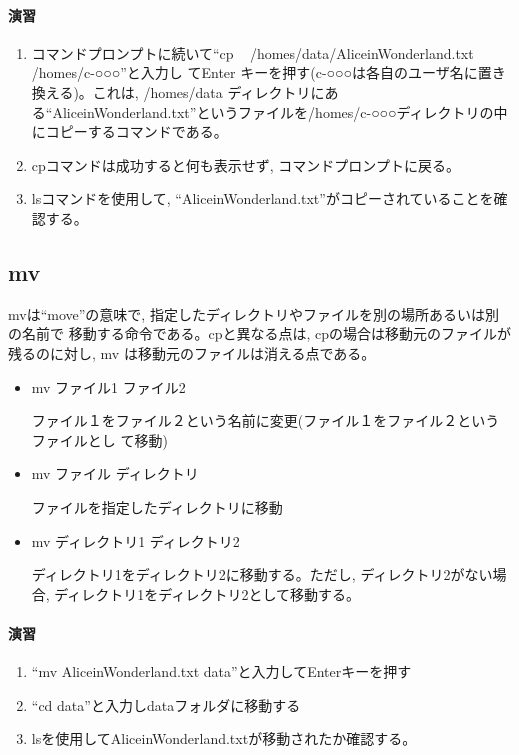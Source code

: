\paragraph{演習}
\begin{enumerate}
\item コマンドプロンプトに続いて``cp ~ /homes/data/AliceinWonderland.txt ~ /homes/c-○○○''と入力し
てEnter キーを押す(c-○○○は各自のユーザ名に置き換える)。これは, /homes/data
ディレクトリにある``AliceinWonderland.txt''というファイルを/homes/c-○○○ディレクトリの中
にコピーするコマンドである。
\item cpコマンドは成功すると何も表示せず, コマンドプロンプトに戻る。
\item lsコマンドを使用して, ``AliceinWonderland.txt''がコピーされていることを確認する。
\end{enumerate}

\subsection{mv}

mvは``move''の意味で, 指定したディレクトリやファイルを別の場所あるいは別の名前で
移動する命令である。cpと異なる点は, cpの場合は移動元のファイルが残るのに対し, mv
は移動元のファイルは消える点である。

\begin{itemize}
\item mv ファイル1 ファイル2

      ファイル１をファイル２という名前に変更(ファイル１をファイル２というファイルとし
      て移動)

\item mv ファイル ディレクトリ

      ファイルを指定したディレクトリに移動

\item mv ディレクトリ1 ディレクトリ2

      ディレクトリ1をディレクトリ2に移動する。ただし, ディレクトリ2がない場合,
      ディレクトリ1をディレクトリ2として移動する。
\end{itemize}

\paragraph{演習}
\begin{enumerate}
    \item ``mv AliceinWonderland.txt data''と入力してEnterキーを押す
    \item ``cd data''と入力しdataフォルダに移動する
    \item lsを使用してAliceinWonderland.txtが移動されたか確認する。
\end{enumerate}

